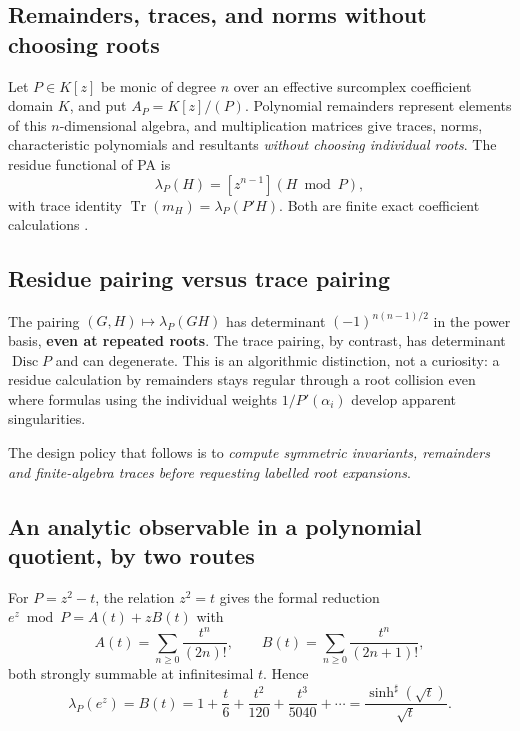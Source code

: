 \documentclass[11pt,letterpaper]{article}
\numberwithin{equation}{section}
\theoremstyle{definition}
\theoremstyle{remark}
\newcommand{\Tr}{\operatorname{Tr}}
\newcommand{\Disc}{\operatorname{Disc}}
\newcommand{\sh}{^{\sharp}}
\begin{document}
\subsection{Remainders, traces, and norms without choosing roots}
\label{cas:sub-remainders}
Let $P\in K[z]$ be monic of degree $n$ over an effective surcomplex coefficient
domain $K$, and put $A_P=K[z]/(P)$. Polynomial remainders represent elements of
this $n$-dimensional algebra, and multiplication matrices give traces, norms,
characteristic polynomials and resultants \emph{without choosing individual
roots}. The residue functional of PA is
\begin{equation}\label{cas:eq-residuefunctional}
 \lambda_P(H)=[z^{n-1}](H\bmod P),
\end{equation}
with trace identity $\Tr(m_H)=\lambda_P(P'H)$. Both are finite exact coefficient
calculations \cite{cas:SourcePolynomial}.

\subsection{Residue pairing versus trace pairing}
\label{cas:sub-pairings}
The pairing $(G,H)\mapsto\lambda_P(GH)$ has determinant $(-1)^{n(n-1)/2}$ in the
power basis, \textbf{even at repeated roots}. The trace pairing, by contrast,
has determinant $\Disc P$ and can degenerate. This is an algorithmic
distinction, not a curiosity: a residue calculation by remainders stays regular
through a root collision even where formulas using the individual weights
$1/P'(\alpha_i)$ develop apparent singularities.

The design policy that follows is to \emph{compute symmetric invariants,
remainders and finite-algebra traces before requesting labelled root
expansions}.

\subsection{An analytic observable in a polynomial quotient, by two routes}
\label{cas:sub-observable}
For $P=z^2-t$, the relation $z^2=t$ gives the formal reduction
$e^z\bmod P=A(t)+zB(t)$ with
\[
 A(t)=\sum_{n\ge0}\frac{t^n}{(2n)!},\qquad
 B(t)=\sum_{n\ge0}\frac{t^n}{(2n+1)!},
\]
both strongly summable at infinitesimal $t$. Hence
\begin{equation}\label{cas:eq-residueexample}
 \lambda_P(e^z)=B(t)=1+\frac t6+\frac{t^2}{120}+\frac{t^3}{5040}+\cdots
 =\frac{\sinh\sh(\sqrt t)}{\sqrt t}.
\end{equation}
\end{document}
